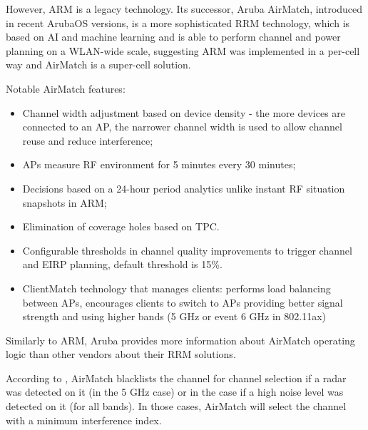 However, ARM is a legacy technology. Its successor, Aruba AirMatch, introduced in recent ArubaOS versions, is a more sophisticated RRM technology, which is based on AI and machine learning and is able to perform channel and power planning on a WLAN-wide scale, suggesting ARM was implemented in a per-cell way and AirMatch is a super-cell solution.

Notable AirMatch features:

\begin{itemize}
    \item Channel width adjustment based on device density - the more devices are connected to an AP, the narrower channel width is used to allow channel reuse and reduce interference;
    \item APs measure RF environment for 5 minutes every 30 minutes;
    \item Decisions based on a 24-hour period analytics unlike instant RF situation snapshots in ARM;
    \item Elimination of coverage holes based on TPC.
    \item Configurable thresholds in channel quality improvements to trigger channel and EIRP planning, default threshold is 15\%.
    \item ClientMatch technology that manages clients: performs load balancing between APs, encourages clients to switch to APs providing better signal strength and using higher bands (5 GHz or event 6 GHz in 802.11ax)
\end{itemize}

Similarly to ARM, Aruba provides more information about AirMatch operating logic than other vendors about their RRM solutions.

According to \cite{ArubaOSUserGuide}, AirMatch blacklists the channel for channel selection if a radar was detected on it (in the 5 GHz case) or in the case if a high noise level was detected on it (for all bands). In those cases, AirMatch will select the channel with a minimum interference index.

